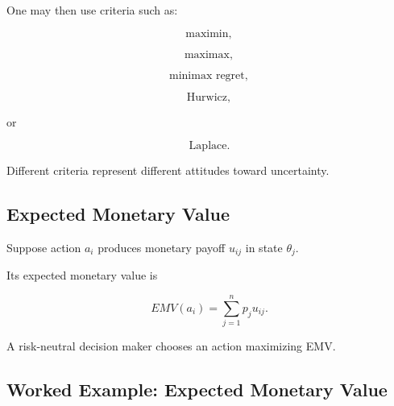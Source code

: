 One may then use criteria such as:

\[
\boxed{
\text{maximin},
}
\]

\[
\boxed{
\text{maximax},
}
\]

\[
\boxed{
\text{minimax regret},
}
\]

\[
\boxed{
\text{Hurwicz},
}
\]

or

\[
\boxed{
\text{Laplace}.
}
\]

Different criteria represent different attitudes toward uncertainty.

\subsection{Expected Monetary Value}
\label{subsec:expected-monetary-value}

Suppose action \(a_i\) produces monetary payoff \(u_{ij}\) in state
\(\theta_j\).

Its expected monetary value is

\[
\boxed{
EMV(a_i)
=
\sum_{j=1}^{n}
p_j
u_{ij}.
}
\]

A risk-neutral decision maker chooses an action maximizing EMV.

\subsection{Worked Example: Expected Monetary Value}
\label{subsec:worked-emv}

